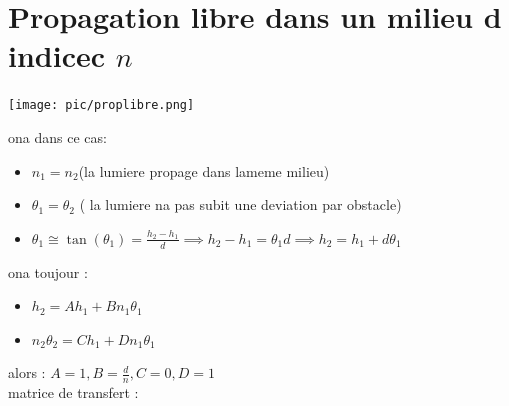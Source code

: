 \documentclass[12pt]{book}
\begin{document}
        \section{Propagation libre dans un milieu d indicec $n$}
            \begin{center}
                \texttt{[image: pic/proplibre.png]}
            \end{center}
            ona dans ce cas:
            \begin{itemize}
                \item $n_1 = n_2$(la lumiere propage dans lameme milieu)
                \item $\theta_1 = \theta_2$ ( la lumiere na pas subit une deviation par obstacle)
                \item $\theta_1 \cong \tan(\theta_1) = \frac{h_2 - h_1}{d} \implies h_2 - h_1 = \theta_1d \implies h_2 =h_1 + d\theta_1$ 
            \end{itemize}
            ona toujour :
            \begin{itemize}
                \item $ h_2 = Ah_1 + Bn_1\theta_1$
                \item $ n_2\theta_2 = Ch_1 + Dn_1\theta_1$
            \end{itemize}
            alors : $ A = 1 , B = \frac{d}{n} ,C = 0 , D = 1$ \\ 
            matrice de transfert : 
            \begin{center}
                 \\
            \end{center}
\end{document}

